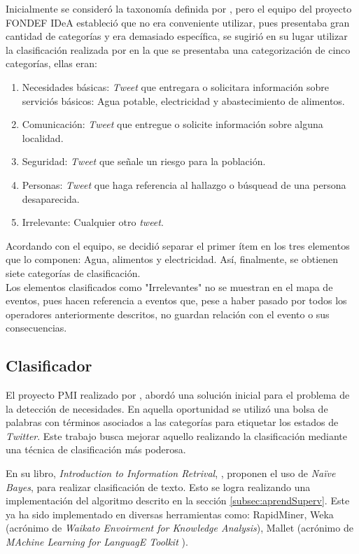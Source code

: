 Inicialmente se consideró la taxonomía definida por \cite{TaxonomiaChato}, pero el equipo del proyecto FONDEF IDeA estableció que no era conveniente utilizar, pues presentaba gran cantidad de categorías y era demasiado específica, se sugirió en su lugar utilizar la clasificación realizada por \cite{Alvarado} en la que se presentaba una categorización de cinco categorías, ellas eran:

\begin{enumerate}
\item Necesidades básicas: \textit{Tweet} que entregara o solicitara información sobre serviciós básicos: Agua potable, electricidad y abastecimiento de alimentos.
\item Comunicación: \textit{Tweet} que entregue o solicite información sobre alguna localidad.
\item Seguridad: \textit{Tweet} que señale un riesgo para la población.
\item Personas: \textit{Tweet} que haga referencia al hallazgo o búsquead de una persona desaparecida.
\item Irrelevante: Cualquier otro \textit{tweet}.
\end{enumerate}

Acordando con el equipo, se decidió separar el primer ítem en los tres elementos que lo componen: Agua, alimentos y electricidad. Así, finalmente, se obtienen siete categorías de clasificación.\\

Los elementos clasificados como "Irrelevantes" no se muestran en el mapa de eventos, pues hacen referencia a eventos que, pese a haber pasado por todos los operadores anteriormente descritos, no guardan relación con el evento o sus consecuencias.

\subsection{Clasificador}
\label{sec:diseno:clasificador}

El proyecto PMI realizado por \cite{WladdimiroPMI}, abordó una solución inicial para el problema de la detección de necesidades. En aquella oportunidad se utilizó una bolsa de palabras con términos asociados a las categorías para etiquetar los estados de \textit{Twitter}. Este trabajo busca mejorar aquello realizando la clasificación mediante una técnica de clasificación más poderosa.

En su libro, \textit{Introduction to Information Retrival}, \cite{IRQE}, proponen el uso de \textit{Naïve Bayes}, para realizar clasificación de texto. Esto se logra realizando una implementación del algoritmo descrito en la sección \ref{subsec:aprendSuperv}. Este ya ha sido implementado en diversas herramientas como: RapidMiner, Weka (acrónimo de \textit{Waikato Envoirment for Knowledge Analysis}), Mallet (acrónimo de \textit{MAchine Learning for LanguagE Toolkit }).

